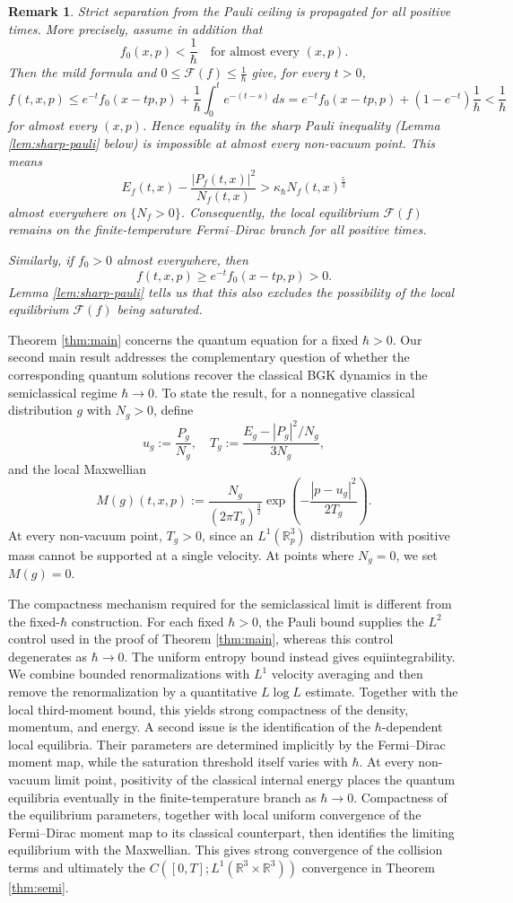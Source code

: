 \documentclass[10pt,reqno]{amsart}
\numberwithin{equation}{section}
\newtheorem{remark}{Remark}[section]
\theoremstyle{definition}
\newcommand{\R}{\mathbb R}
\newcommand{\calF}{\mathcal F}
\newcommand{\lt}{\left}
\newcommand{\rt}{\right}
\begin{document}
\begin{remark}
Strict separation from the Pauli ceiling is propagated for all positive times.  More precisely, assume in addition that
\[
 f_0(x,p)<\frac1\hbar   \quad\text{for almost every }(x,p).
\]
Then the mild formula and $0\le\calF(f)\le\frac1\hbar $ give, for every $t>0$,
\[
 f(t,x,p) \le  e^{-t}f_0(x-tp,p)  +  \frac1\hbar \int_0^t e^{-(t-s)}\,ds   =  e^{-t}f_0(x-tp,p)  +(1-e^{-t})\frac1\hbar   <\frac1\hbar 
\]
for almost every $(x,p)$.  Hence equality in the sharp Pauli inequality (Lemma \ref{lem:sharp-pauli} below) is impossible at almost every non-vacuum point. This means
\[
 E_f(t,x)-\frac{|P_f(t,x)|^2}{N_f(t,x)}  >  \kappa_\hbar N_f(t,x)^{\frac53}
\]
almost everywhere on $\{N_f>0\}$.  Consequently, the local equilibrium $\calF(f)$ remains on the finite-temperature Fermi--Dirac branch for all positive times.

Similarly, if $f_0>0$ almost everywhere, then
\[
 f(t,x,p)\ge e^{-t}f_0(x-tp,p)>0.
\]
 Lemma \ref{lem:sharp-pauli} tells us that this also excludes the possibility of the local equilibrium $\calF(f)$ being saturated. 
\end{remark}


Theorem \ref{thm:main} concerns the quantum equation for a fixed $\hbar>0$.  Our second main result addresses the complementary question of whether the corresponding quantum solutions recover the classical BGK dynamics in the semiclassical regime $\hbar\to0$.  To state the result, for a nonnegative classical distribution $g$ with $N_g>0$, define
\[
 u_g:=\frac{P_g}{N_g},  \quad  T_g:=\frac{E_g-|P_g|^2/N_g}{3N_g},
\]
and the local Maxwellian
\[
 M(g)(t,x,p)  :=  \frac{N_g}{(2\pi T_g)^{\frac32}}  \exp \lt(-\frac{|p-u_g|^2}{2T_g}\rt).
\]
At every non-vacuum point, $T_g>0$, since an $L^1(\R^3_p)$ distribution with positive mass cannot be supported at a single velocity. At points where $N_g=0$, we set $M(g)=0$.

The compactness mechanism required for the semiclassical limit is different from the fixed-$\hbar$ construction.  For each fixed $\hbar>0$, the Pauli bound supplies the $L^2$ control used in the proof of Theorem \ref{thm:main}, whereas this control degenerates as $\hbar\to0$.  The uniform entropy bound instead gives equiintegrability. We combine bounded renormalizations with $L^1$ velocity averaging and then remove the renormalization by a quantitative $L\log L$ estimate. Together with the local third-moment bound, this yields strong compactness of the density, momentum, and energy. A second issue is the identification of the $\hbar$-dependent local equilibria.  Their parameters are determined implicitly by the Fermi--Dirac moment map, while the saturation threshold itself varies with $\hbar$.  At every non-vacuum limit point, positivity of the classical internal energy places the quantum equilibria eventually in the finite-temperature branch as $\hbar\to0$.  Compactness of the equilibrium parameters, together with local uniform convergence of the Fermi--Dirac moment map to its classical counterpart, then identifies the limiting equilibrium with the Maxwellian.  This gives strong convergence of the collision terms and ultimately the $C([0,T];L^1(\R^3\times\R^3))$ convergence in Theorem \ref{thm:semi}.
\end{document}
